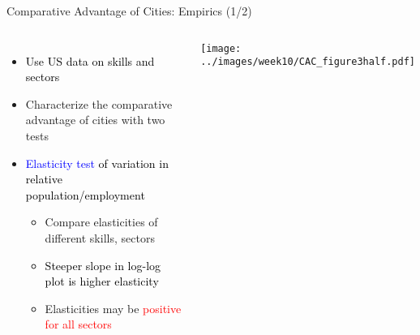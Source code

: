 \documentclass[10pt,notes=hide]{beamer}
\begin{document}
\begin{frame}{Comparative Advantage of Cities: Empirics (1/2)}

\begin{columns}

\begin{itemize}
\item \textcolor{black}{Use US data on skills and sectors}
\item Characterize the comparative advantage of cities with two tests
\item \textcolor{blue}{Elasticity test }\textcolor{black}{of variation in
relative population/employment}

\begin{itemize}
\item Compare elasticities of different skills, sectors
\item \textcolor{black}{Steeper slope in log-log plot is higher elasticity}
\item Elasticities may be \textcolor{red}{positive for all sectors}
\end{itemize}
\end{itemize}
\texttt{[image: ../images/week10/CAC\_figure3half.pdf]}

\end{columns}
\end{frame}
\end{document}
